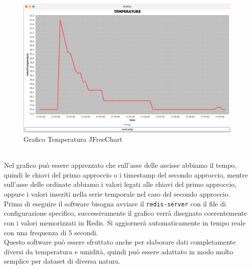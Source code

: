 \begin{figure}[H]
\includegraphics[width=1\textwidth]{img/chartTemperature}
    \caption{Grafico Temperatura JFreeChart}
\end{figure}

\\

Nel grafico può essere apprezzato che sull'asse delle ascisse abbiamo il tempo, quindi le chiavi del primo approccio o i timestamp del secondo approccio,
mentre sull'asse delle ordinate abbiamo i valori legati alle chiavi del primo approccio, oppure i valori inseriti nella serie temporale nel caso del secondo approccio.\\
Prima di eseguire il software bisogna avviare il \texttt{redis-server} con il file di configurazione specifico,
successivamente il grafico verrà disegnato coerentemente con i valori memorizzati in Redis.
Si aggiornerà automaticamente in tempo reale con una frequenza di 5 secondi.\\
Questo software può essere sfruttato anche per elaborare dati completamente diversi da temperatura e umidità, quindi può essere
adattato in modo molto semplice per dataset di diversa natura.